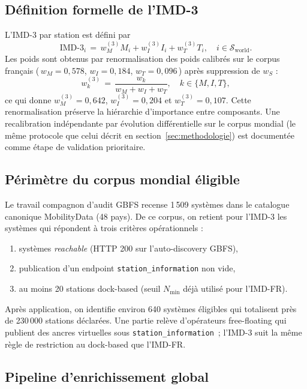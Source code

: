 \documentclass[11pt,a4paper]{article}
\begin{document}
\subsection{Définition formelle de l'IMD-3}

L'IMD-3 par station est défini par
\begin{equation}
\text{IMD-3}_i \,=\, w_M^{(3)} M_i + w_I^{(3)} I_i + w_T^{(3)} T_i,
\quad i \in \mathcal{S}_{\text{world}}.
\end{equation}
Les poids sont obtenus par renormalisation des poids
calibrés sur le corpus français (\,$w_M=0{,}578$,
$w_I=0{,}184$, $w_T=0{,}096$\,) après suppression de $w_S$ :
\begin{equation}
w_k^{(3)} \,=\, \frac{w_k}{w_M + w_I + w_T},
\quad k \in \{M, I, T\},
\end{equation}
ce qui donne $w_M^{(3)} = 0{,}642$, $w_I^{(3)} = 0{,}204$ et
$w_T^{(3)} = 0{,}107$. Cette renormalisation préserve la
hiérarchie d'importance entre composants. Une recalibration
indépendante par évolution différentielle sur le corpus mondial
(le même protocole que celui décrit en
section~\ref{sec:methodologie}) est documentée comme étape de
validation prioritaire.

\subsection{Périmètre du corpus mondial éligible}

Le travail compagnon d'audit GBFS recense 1\,509 systèmes dans
le catalogue canonique MobilityData (48 pays). De ce corpus,
on retient pour l'IMD-3 les systèmes qui répondent à trois
critères opérationnels :
\begin{enumerate}[leftmargin=*]
  \item systèmes \emph{reachable} (HTTP 200 sur l'auto-discovery
        GBFS),
  \item publication d'un endpoint \texttt{station\_information}
        non vide,
  \item au moins 20 stations dock-based (seuil $N_{\min}$ déjà
        utilisé pour l'IMD-FR).
\end{enumerate}
Après application, on identifie environ 640 systèmes éligibles
qui totalisent près de 230\,000 stations déclarées. Une partie
relève d'opérateurs free-floating qui publient des ancres
virtuelles sous \texttt{station\_information}~; l'IMD-3
suit la même règle de restriction au dock-based que l'IMD-FR.

\subsection{Pipeline d'enrichissement global}
\end{document}
